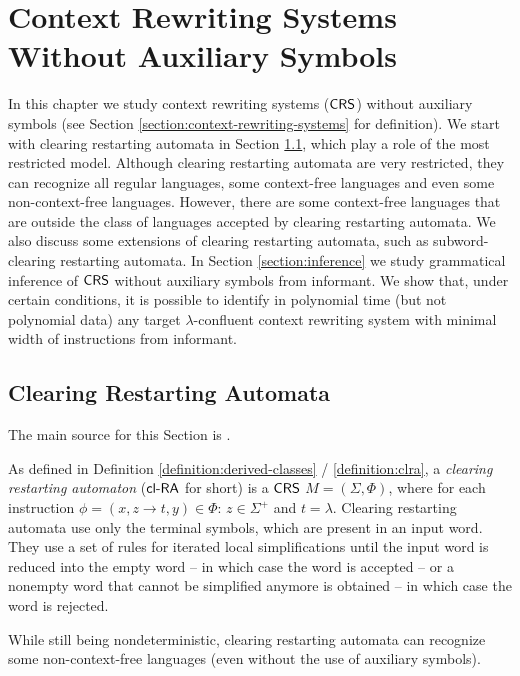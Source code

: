 \chapter{Context Rewriting Systems Without Auxiliary Symbols}\label{chapter:crs_nonaux}

In this chapter we study context rewriting systems ($\textup{\sf CRS\/}$) without auxiliary symbols (see Section \ref{section:context-rewriting-systems} for definition). We start with clearing restarting automata in Section \ref{section:clra}, which play a role of the most restricted model. Although clearing restarting automata are very restricted, they can recognize all regular languages, some context-free languages and even some non-context-free languages. However, there are some context-free languages that are outside the class of languages accepted by clearing restarting automata. We also discuss some extensions of clearing restarting automata, such as subword-clearing restarting automata. In Section \ref{section:inference} we study grammatical inference of $\textup{\sf CRS\/}$ without auxiliary symbols from informant. We show that, under certain conditions, it is possible to identify in polynomial time (but not polynomial data) any target $\lambda$-confluent context rewriting system with minimal width of instructions from informant.

\section{Clearing Restarting Automata}\label{section:clra}

The main source for this Section is \cite{C10Diploma, CM10}.

As defined in Definition \ref{definition:derived-classes} / \ref{definition:clra}, a \emph{clearing restarting automaton} \cite{CM10} (\emph{$\textup{\sf cl-RA\/}$} for short) is a $\textup{\sf CRS\/}$ $M = (\Sigma, \Phi)$, where for each instruction $\phi = (x, z \to t, y) \in \Phi$: $z \in \Sigma^+$ and $t = \lambda$. Clearing restarting automata use only the terminal symbols, which are present in an input word. They use a set of rules for iterated local simplifications until the input word is reduced into the empty word -- in which case the word is accepted -- or a nonempty word that cannot be simplified anymore is obtained -- in which case the word is rejected.

While still being nondeterministic, clearing restarting automata can recognize some non-context-free languages (even without the use of auxiliary symbols).

